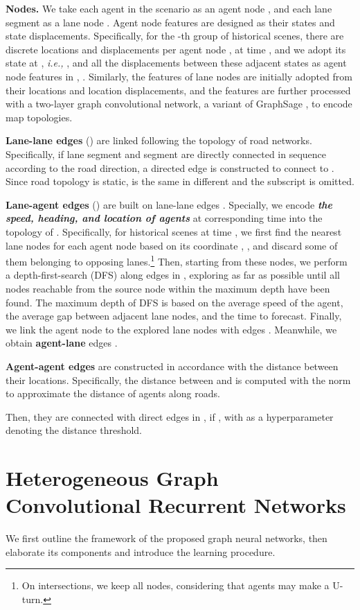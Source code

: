 \documentclass[letterpaper, 10 pt, conference]{ieeeconf}
\begin{document}
\textbf{Nodes.} We take each agent in the scenario as an agent node , and each lane segment as a lane node . 
Agent node features are designed as  their states 
and state displacements. Specifically, for the -th group of historical scenes, there are  discrete locations and displacements per agent node ,  at time  , and we adopt its state at , \emph{i.e.,} , and all the displacements between these  adjacent states as agent node features  in , .
Similarly, the features of lane nodes are initially adopted from their locations and location displacements, and the features are further processed with a two-layer graph convolutional network,  a variant of GraphSage \cite{hamilton2017inductive}, to encode map topologies.

\textbf{Lane-lane edges} () are linked following the topology of road networks. Specifically, if  lane segment  and  segment   are directly connected in sequence according to the road direction, a directed edge  is constructed to connect  to . Since road topology is static,   is the same in different  and the subscript  is omitted.

\textbf{Lane-agent edges} () are built on lane-lane edges . Specially, we encode \textbf{\textit{the speed, heading, and location of agents}} at corresponding time into the topology of . Specifically, for historical scenes at time ,  we first find the  nearest lane nodes for each agent node  based on  its coordinate ,  , and discard some of them belonging to opposing lanes.\footnote{On intersections, we keep all  nodes, considering that agents may make a U-turn.} Then, starting from these nodes, we perform a depth-first-search (DFS) along edges in , exploring as far as possible until all nodes reachable from the source node within the maximum depth have been found. The maximum depth of DFS is based on the average speed of the agent, the average gap between adjacent lane nodes, and the time to forecast. Finally, we link the agent node  to the explored lane nodes  with edges . Meanwhile, we obtain \textbf{agent-lane} edges .

\textbf{Agent-agent edges} are constructed in accordance with the distance between their locations. Specifically, the distance between  and   is computed with the  norm to approximate the distance of agents along roads.

Then, they are connected with direct edges   in ,  if , with  as a hyperparameter denoting the distance threshold.

\section{Heterogeneous Graph Convolutional Recurrent Networks}
We first outline the framework of the proposed graph neural networks,  then elaborate its components and introduce the learning procedure.
\end{document}
